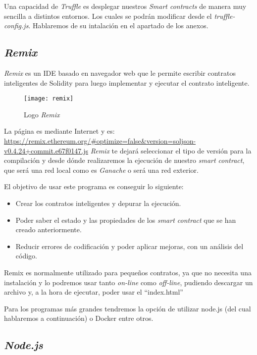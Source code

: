 Una capacidad de \textit{Truffle} es desplegar nuestros \textit{Smart contracts} de manera muy sencilla a distintos entornos. Los cuales se podrán modificar desde el \textit{truffle-config.js}. Hablaremos de su intalación en el apartado de los anexos. 

\subsection{\textit{Remix}}

\textit{Remix}\cite{remix} es un IDE basado en navegador web que le permite escribir contratos inteligentes de Solidity para luego implementar y ejecutar el contrato inteligente.

\begin{wrapfigure}{r}{0.4\linewidth}
    \centering
    \texttt{[image: remix]}
    \caption{Logo \textit{Remix}}
\end{wrapfigure}

La página es mediante Internet y es: \url{https://remix.ethereum.org/#optimize=false&version=soljson-v0.4.24+commit.e67f0147.js} \textit{Remix} te dejará seleccionar el tipo de versión para la compilación y desde dónde realizaremos la ejecución de nuestro \textit{smart contract}, que será una red local como es \textit{Ganache} o será una red exterior.

El objetivo de usar este programa es conseguir lo siguiente:

\begin{itemize}
	\item Crear los contratos inteligentes y depurar la ejecución.
	\item Poder saber el estado y las propiedades de los \textit{smart contract} que se han creado anteriormente.
	\item Reducir errores de codificación y poder aplicar mejoras, con un análisis del código.
\end{itemize}

Remix es normalmente utilizado para pequeños contratos, ya que no necesita una instalación y lo podremos usar tanto \textit{on-line} como \textit{off-line}, pudiendo descargar un archivo y, a la hora de ejecutar, poder usar el ``index.html''

Para los programas más grandes tendremos la opción de utilizar node.js (del cual hablaremos a continuación) o Docker entre otros.

\subsection{\textit{Node.js}}

